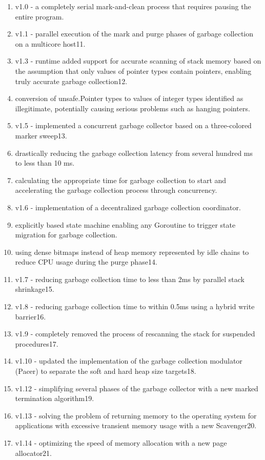 \documentclass[a4paper]{article}
\theoremstyle{definition}
\begin{document}
\begin{enumerate}
  \item v1.0 - a completely serial mark-and-clean process that requires pausing the entire program.
\item v1.1 - parallel execution of the mark and purge phases of garbage collection on a multicore host11.
\item v1.3 - runtime added support for accurate scanning of stack memory based on the assumption that only values of pointer types contain pointers, enabling truly accurate garbage collection12.
\item conversion of unsafe.Pointer types to values of integer types identified as illegitimate, potentially causing serious problems such as hanging pointers.
\item v1.5 - implemented a concurrent garbage collector based on a three-colored marker sweep13.
\item drastically reducing the garbage collection latency from several hundred ms to less than 10 ms.
\item calculating the appropriate time for garbage collection to start and accelerating the garbage collection process through concurrency.
\item v1.6 - implementation of a decentralized garbage collection coordinator.
\item explicitly based state machine enabling any Goroutine to trigger state migration for garbage collection.
\item using dense bitmaps instead of heap memory represented by idle chains to reduce CPU usage during the purge phase14.
\item v1.7 - reducing garbage collection time to less than 2ms by parallel stack shrinkage15.
\item v1.8 - reducing garbage collection time to within 0.5ms using a hybrid write barrier16.
\item v1.9 - completely removed the process of rescanning the stack for suspended procedures17.
\item v1.10 - updated the implementation of the garbage collection modulator (Pacer) to separate the soft and hard heap size targets18.
\item v1.12 - simplifying several phases of the garbage collector with a new marked termination algorithm19.
\item v1.13 - solving the problem of returning memory to the operating system for applications with excessive transient memory usage with a new Scavenger20.
\item v1.14 - optimizing the speed of memory allocation with a new page allocator21.
\end{enumerate}
\end{document}
